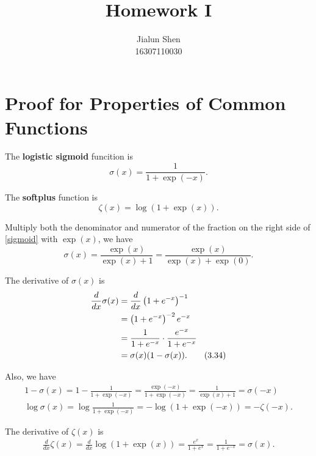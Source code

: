 \documentclass[11pt]{article}
\title{Homework I}
\author{Jialun Shen\\
  16307110030 \\ }
\begin{document}
\maketitle
\section{Proof for Properties of Common Functions}

The \textbf{logistic sigmoid} funcition is
\begin{equation}
\sigma(x) = \frac{1}{1+\exp(-x)}. \tag{3.30}\label{sigmoid}
\end{equation}

The \textbf{softplus} function is
\begin{equation}
\zeta(x) = \log(1+\exp(x)). \tag{3.31}\label{softplus}
\end{equation}

Multiply both the denominator and numerator of the fraction on the right side of \autoref{sigmoid} with $\exp(x)$, we have
\begin{equation}
\sigma(x) = \frac{\exp(x)}{\exp(x)+1} = \frac{\exp(x)}{\exp(x)+\exp(0)}. \tag{3.33}
\end{equation}

The derivative of $\sigma(x)$ is
\begin{align}
\frac{d}{dx}\sigma(x) &= \frac{d}{dx}\left(1+e^{-x}\right)^{-1} \notag\\
&= \left(1+e^{-x}\right)^{-2}e^{-x} \notag\\
&= \frac{1}{1+e^{-x}}\cdot\frac{e^{-x}}{1+e^{-x}} \notag\\
&= \sigma(x)(1-\sigma(x)). \tag{3.34}
\end{align}

Also, we have
\begin{align}
1 - \sigma(x) = 1 - \frac{1}{1+\exp(-x)} = \frac{\exp(-x)}{1+\exp(-x)}
= \frac{1}{\exp(x)+1} = \sigma(-x) \tag{3.35}\\
\log\sigma(x) = \log\frac{1}{1+\exp(-x)} =  -\log(1+\exp(-x))
= -\zeta(-x). \tag{3.36}
\end{align}

The derivative of $\zeta(x)$ is
\begin{align}
\frac{d}{dx}\zeta(x) = \frac{d}{dx}\log(1+\exp(x)) 
= \frac{e^{x}}{1+e^x} = \frac{1}{1+e^{-x}} = \sigma(x). \tag{3.37}
\end{align}
\end{document}
